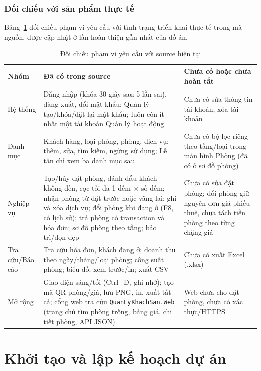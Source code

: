 \documentclass[14pt]{report}
\begin{document}
\subsection{Đối chiếu với sản phẩm thực tế}

Bảng~\ref{tab:doichieu-c1} đối chiếu phạm vi yêu cầu với tình trạng triển khai thực tế trong mã nguồn, được cập nhật ở lần hoàn thiện gần nhất của đồ án.

\begin{table}[H]
\centering
\caption{Đối chiếu phạm vi yêu cầu với source hiện tại}
\label{tab:doichieu-c1}
\begin{tabularx}{\textwidth}{|l|X|X|}
\hline
\textbf{Nhóm} & \textbf{Đã có trong source} & \textbf{Chưa có hoặc chưa hoàn tất} \\\hline
Hệ thống & Đăng nhập (khóa 30 giây sau 5 lần sai), đăng xuất, đổi mật khẩu; Quản lý tạo/khóa/đặt lại mật khẩu; luôn còn ít nhất một tài khoản Quản lý hoạt động & Chưa có sửa thông tin tài khoản, xóa tài khoản \\\hline
Danh mục & Khách hàng, loại phòng, phòng, dịch vụ: thêm, sửa, tìm kiếm, ngừng sử dụng; Lễ tân chỉ xem ba danh mục sau & Chưa có bộ lọc riêng theo tầng/loại trong màn hình Phòng (đã có ở sơ đồ phòng) \\\hline
Nghiệp vụ & Tạo/hủy đặt phòng, đánh dấu khách không đến, cọc tối đa 1 đêm × số đêm; nhận phòng từ đặt trước hoặc vãng lai; ghi và xóa dịch vụ; đổi phòng khi đang ở (F8, có lịch sử); trả phòng có transaction và hóa đơn; sơ đồ phòng theo tầng; bảo trì/dọn dẹp & Chưa có sửa đặt phòng; đổi phòng giữ nguyên đơn giá phiếu thuê, chưa tách tiền phòng theo từng chặng giá \\\hline
Tra cứu/Báo cáo & Tra cứu hóa đơn, khách đang ở; doanh thu theo ngày/tháng/loại phòng; công suất phòng; biểu đồ; xem trước/in; xuất CSV & Chưa có xuất Excel (.xlsx) \\\hline
Mở rộng & Giao diện sáng/tối (Ctrl+D, ghi nhớ); tạo mã QR phòng/giá, lưu PNG, in, xuất tất cả; cổng web tra cứu \texttt{QuanLyKhachSan.Web} (trang chủ tìm phòng trống, bảng giá, chi tiết phòng, API JSON) & Web chưa cho đặt phòng, chưa có xác thực/HTTPS \\\hline
\end{tabularx}
\end{table}


\chapter{Khởi tạo và lập kế hoạch dự án}
\end{document}
